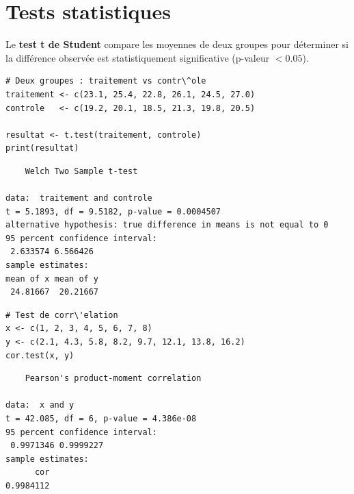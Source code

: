 \section{Tests statistiques}

\begin{definition}
Le \textbf{test t de Student} compare les moyennes de deux groupes
pour d\'eterminer si la diff\'erence observ\'ee est statistiquement significative
(p-valeur $< 0.05$).
\end{definition}

\begin{codeblock}[title=\textbf{R}]
\begin{verbatim}
# Deux groupes : traitement vs contr\^ole
traitement <- c(23.1, 25.4, 22.8, 26.1, 24.5, 27.0)
controle   <- c(19.2, 20.1, 18.5, 21.3, 19.8, 20.5)

resultat <- t.test(traitement, controle)
print(resultat)
\end{verbatim}
\end{codeblock}

\begin{codeoutput}
\begin{verbatim}
	Welch Two Sample t-test

data:  traitement and controle
t = 5.1893, df = 9.5182, p-value = 0.0004507
alternative hypothesis: true difference in means is not equal to 0
95 percent confidence interval:
 2.633574 6.566426
sample estimates:
mean of x mean of y
 24.81667  20.21667
\end{verbatim}
\end{codeoutput}

\begin{codeblock}[title=\textbf{R}]
\begin{verbatim}
# Test de corr\'elation
x <- c(1, 2, 3, 4, 5, 6, 7, 8)
y <- c(2.1, 4.3, 5.8, 8.2, 9.7, 12.1, 13.8, 16.2)
cor.test(x, y)
\end{verbatim}
\end{codeblock}

\begin{codeoutput}
\begin{verbatim}
	Pearson's product-moment correlation

data:  x and y
t = 42.085, df = 6, p-value = 4.386e-08
95 percent confidence interval:
 0.9971346 0.9999227
sample estimates:
      cor
0.9984112
\end{verbatim}
\end{codeoutput}

